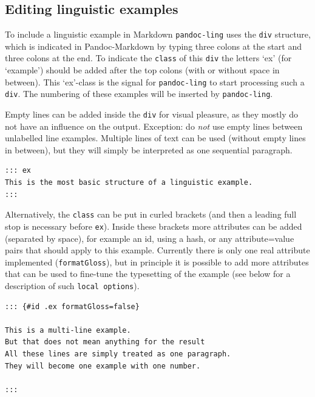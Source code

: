 \documentclass[
]{article}
\begin{document}
\hypertarget{editing-linguistic-examples}{%
\subsection{Editing linguistic
examples}\label{editing-linguistic-examples}}

To include a linguistic example in Markdown \texttt{pandoc-ling} uses
the \texttt{div} structure, which is indicated in Pandoc-Markdown by
typing three colons at the start and three colons at the end. To
indicate the \texttt{class} of this \texttt{div} the letters `ex' (for
`example') should be added after the top colons (with or without space
in between). This `ex'-class is the signal for \texttt{pandoc-ling} to
start processing such a \texttt{div}. The numbering of these examples
will be inserted by \texttt{pandoc-ling}.

Empty lines can be added inside the \texttt{div} for visual pleasure, as
they mostly do not have an influence on the output. Exception: do
\emph{not} use empty lines between unlabelled line examples. Multiple
lines of text can be used (without empty lines in between), but they
will simply be interpreted as one sequential paragraph.

\begin{verbatim}
::: ex
This is the most basic structure of a linguistic example. 
:::
\end{verbatim}

\begin{samepage}
\begin{exe} \judgewidth{}
  \label{ex:4.1}
\end{exe}
\end{samepage}

Alternatively, the \texttt{class} can be put in curled brackets (and
then a leading full stop is necessary before \texttt{ex}). Inside these
brackets more attributes can be added (separated by space), for example
an id, using a hash, or any attribute=value pairs that should apply to
this example. Currently there is only one real attribute implemented
(\texttt{formatGloss}), but in principle it is possible to add more
attributes that can be used to fine-tune the typesetting of the example
(see below for a description of such \texttt{local\ options}).

\begin{verbatim}
::: {#id .ex formatGloss=false}

This is a multi-line example.
But that does not mean anything for the result
All these lines are simply treated as one paragraph.
They will become one example with one number.

:::
\end{verbatim}
\end{document}
